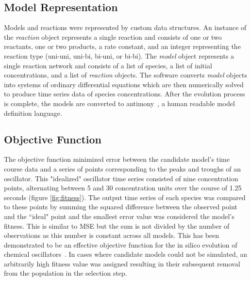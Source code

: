 \documentclass[12pt]{report}
\begin{document}
\subsection{Model Representation}
Models and reactions were represented by custom data structures. An instance of the \textit{reaction} object represents a single reaction and consists of one or two reactants, one or two products, a rate constant, and an integer representing the reaction type (uni-uni, uni-bi, bi-uni, or bi-bi). The \textit{model} object represents a single reaction network and consists of a list of species, a list of initial concentrations, and a list of \textit{reaction} objects. The software converts \textit{model} objects into systems of ordinary differential equations which are then numerically solved to produce time series data of species concentrations. After the evolution process is complete, the models are converted to antimony~\cite{Smith2009}, a human readable model definition language.

\subsection{Objective Function}

The objective function minimized error between the candidate model's time course data and a series of points corresponding to the peaks and troughs of an oscillator. This "idealized" oscillator time series consisted of nine concentration points, alternating between 5 and 30 concentration units over the course of 1.25 seconds (figure \ref{fig:fitness}). The output time series of each species was compared to these points by summing the squared difference between the observed point and the ``ideal" point and the smallest error value was considered the model's fitness. This is similar to MSE but the sum is not divided by the number of observations as this number is constant across all models. This has been demonstrated to be an effective objective function for the in silico evolution of chemical oscillators~\cite{Paladugu2006}.  In cases where candidate models could not be simulated, an arbitrarily high fitness value was assigned resulting in their subsequent removal from the population in the selection step.  
\end{document}
